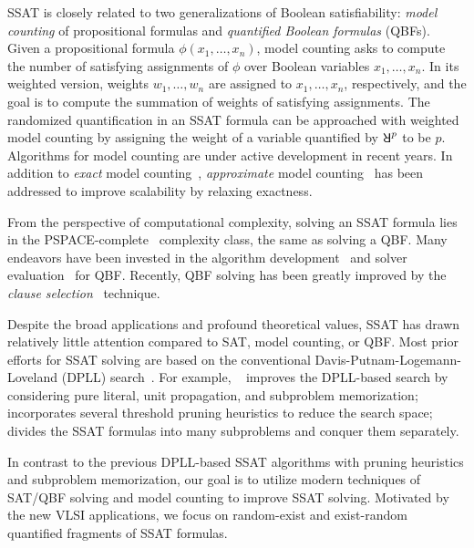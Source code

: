SSAT is closely related to two generalizations of Boolean satisfiability:
\textit{model counting} of propositional formulas and \textit{quantified Boolean formulas} (QBFs).
Given a propositional formula $\phi(x_1,\ldots,x_n)$, model counting asks to compute the number of satisfying assignments of $\phi$ over Boolean variables $x_1,\ldots,x_n$.
In its weighted version, weights $w_1,\ldots,w_n$ are assigned to $x_1,\ldots,x_n$, respectively,
and the goal is to compute the summation of weights of satisfying assignments.
The randomized quantification in an SSAT formula can be approached with weighted model counting by assigning the weight of a variable quantified by $\random{p}$ to be $p$.
Algorithms for model counting are under active development in recent years.
In addition to \textit{exact} model counting~\cite{Sang2004,Sang2005ModelCounting},
\textit{approximate} model counting~\cite{Gomes2006,Gomes2007,Chakraborty2016} has been addressed to improve scalability by relaxing exactness.

From the perspective of computational complexity,
solving an SSAT formula lies in the PSPACE-complete~\cite{Stockmeyer1973} complexity class,
the same as solving a QBF.
Many endeavors have been invested in the algorithm development~\cite{SATHandbook-QBF} and solver evaluation~\cite{Narizzano2006} for QBF.
Recently, QBF solving has been greatly improved by the \textit{clause selection}~\cite{Janota2015,Rabe2015} technique.

Despite the broad applications and profound theoretical values,
SSAT has drawn relatively little attention compared to SAT, model counting, or QBF.
Most prior efforts for SSAT solving are based on the conventional Davis-Putnam-Logemann-Loveland (DPLL) search~\cite{Davis1962}.
For example, \maxplan~\cite{Majercik1998} improves the DPLL-based search by considering pure literal, unit propagation, and subproblem memorization;
\zander~\cite{Majercik2003} incorporates several threshold pruning heuristics to reduce the search space;
\dcssat~\cite{Majercik2005} divides the SSAT formulas into many subproblems and conquer them separately.

In contrast to the previous DPLL-based SSAT algorithms with pruning heuristics and subproblem memorization,
our goal is to utilize modern techniques of SAT/QBF solving and model counting to improve SSAT solving.
Motivated by the new VLSI applications, we focus on random-exist and exist-random quantified fragments of SSAT formulas.

